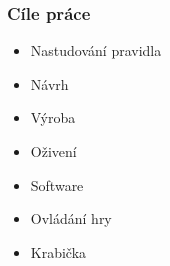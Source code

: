 \documentclass[%
  12pt,       				%
	t,                  %
	aspectratio=1610,   %
	unicode,						%
]{beamer}				    	%
\begin{document}
\disablenavigationsymbols

\maketitle

\begin{frame} 
	\frametitle{Cíle práce}
	\vspace{1cm}
	\begin{itemize}
			\item Nastudování pravidla
			\item Návrh
			\item Výroba
			\item Oživení
			\item Software
			\item Ovládání hry
			\item Krabička
	\end{itemize}
\end{frame}
\end{document}
